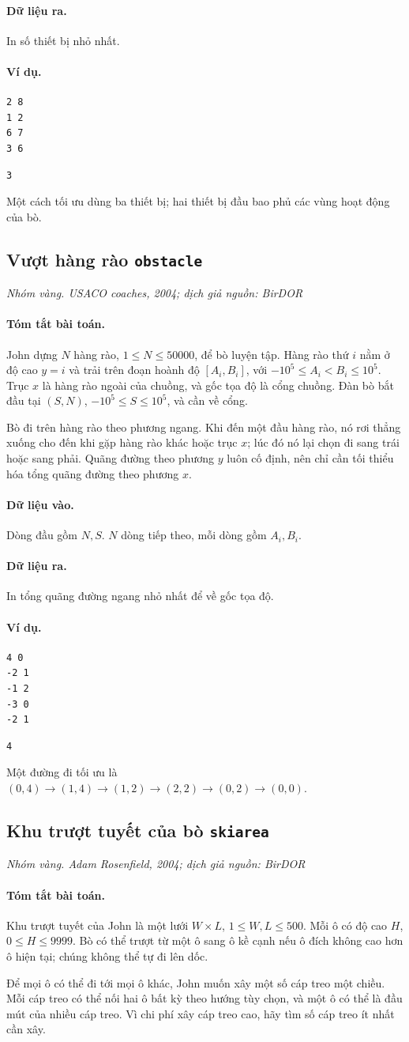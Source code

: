 \documentclass[11pt]{article}
\newcommand{\problem}[4]{%
  \subsection[#1 (#2)]{#1 \hfill {\normalsize\texttt{#2}}}%
  \noindent\textit{#3. #4}\par\smallskip
}
\newcommand{\iosec}[1]{\paragraph{#1}}
\begin{document}
\iosec{Dữ liệu ra.}
In số thiết bị nhỏ nhất.

\iosec{Ví dụ.}
\begin{verbatim}
2 8
1 2
6 7
3 6
\end{verbatim}

\begin{verbatim}
3
\end{verbatim}

Một cách tối ưu dùng ba thiết bị; hai thiết bị đầu bao phủ các vùng hoạt động
của bò.

\problem{Vượt hàng rào}{obstacle}{Nhóm vàng}{USACO coaches, 2004; dịch giả nguồn: BirDOR}

\iosec{Tóm tắt bài toán.}
John dựng \(N\) hàng rào, \(1\le N\le 50000\), để bò luyện tập. Hàng rào
thứ \(i\) nằm ở độ cao \(y=i\) và trải trên đoạn hoành độ
\([A_i,B_i]\), với \(-10^5\le A_i<B_i\le 10^5\). Trục \(x\) là hàng rào ngoài
của chuồng, và gốc tọa độ là cổng chuồng. Đàn bò bắt đầu tại \((S,N)\),
\(-10^5\le S\le 10^5\), và cần về cổng.

Bò đi trên hàng rào theo phương ngang. Khi đến một đầu hàng rào, nó rơi thẳng
xuống cho đến khi gặp hàng rào khác hoặc trục \(x\); lúc đó nó lại chọn đi
sang trái hoặc sang phải. Quãng đường theo phương \(y\) luôn cố định, nên chỉ
cần tối thiểu hóa tổng quãng đường theo phương \(x\).

\iosec{Dữ liệu vào.}
Dòng đầu gồm \(N,S\). \(N\) dòng tiếp theo, mỗi dòng gồm \(A_i,B_i\).

\iosec{Dữ liệu ra.}
In tổng quãng đường ngang nhỏ nhất để về gốc tọa độ.

\iosec{Ví dụ.}
\begin{verbatim}
4 0
-2 1
-1 2
-3 0
-2 1
\end{verbatim}

\begin{verbatim}
4
\end{verbatim}

Một đường đi tối ưu là
\((0,4)\to(1,4)\to(1,2)\to(2,2)\to(0,2)\to(0,0)\).

\problem{Khu trượt tuyết của bò}{skiarea}{Nhóm vàng}{Adam Rosenfield, 2004; dịch giả nguồn: BirDOR}

\iosec{Tóm tắt bài toán.}
Khu trượt tuyết của John là một lưới \(W\times L\),
\(1\le W,L\le 500\). Mỗi ô có độ cao \(H\), \(0\le H\le 9999\). Bò có thể
trượt từ một ô sang ô kề cạnh nếu ô đích không cao hơn ô hiện tại; chúng không
thể tự đi lên dốc.

Để mọi ô có thể đi tới mọi ô khác, John muốn xây một số cáp treo một chiều.
Mỗi cáp treo có thể nối hai ô bất kỳ theo hướng tùy chọn, và một ô có thể là
đầu mút của nhiều cáp treo. Vì chi phí xây cáp treo cao, hãy tìm số cáp treo
ít nhất cần xây.
\end{document}
